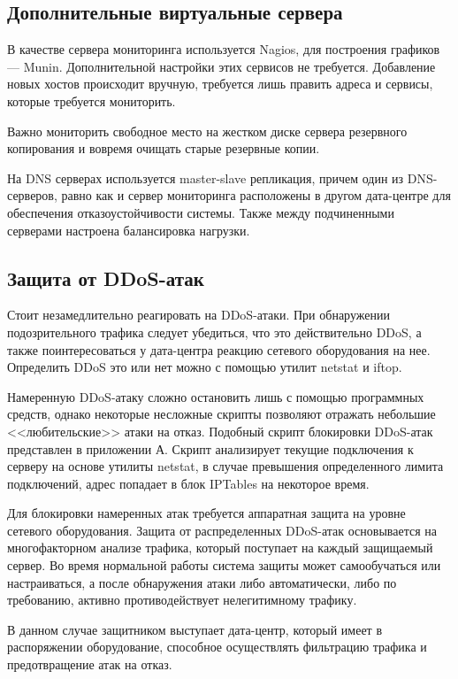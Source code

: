 \subsection{Дополнительные виртуальные сервера}

В качестве сервера мониторинга используется Nagios, для построения графиков --- Munin.
Дополнительной настройки этих сервисов не требуется.
Добавление новых хостов происходит вручную, требуется лишь править адреса и сервисы, которые требуется мониторить.

Важно мониторить свободное место на жестком диске сервера резервного копирования и вовремя очищать старые резервные копии.

На DNS серверах используется master-slave репликация, причем один из DNS-серверов, равно как и сервер мониторинга расположены в другом дата-центре для обеспечения отказоустойчивости системы.
Также между подчиненными серверами настроена балансировка нагрузки.

\subsection{Защита от DDoS-атак}

Стоит незамедлительно реагировать на DDoS-атаки.
При обнаружении подозрительного трафика следует убедиться, что это действительно DDoS, а также поинтересоваться у дата-центра реакцию сетевого оборудования на нее.
Определить DDoS это или нет можно с помощью утилит netstat и iftop.

Намеренную DDoS-атаку сложно остановить лишь с помощью программных средств, однако некоторые несложные скрипты позволяют отражать небольшие <<любительские>> атаки на отказ.
Подобный скрипт блокировки DDoS-атак представлен в приложении А.
Скрипт анализирует текущие подключения к серверу на основе утилиты netstat, в случае превышения определенного лимита подключений, адрес попадает в блок IPTables на некоторое время.

Для блокировки намеренных атак требуется аппаратная защита на уровне сетевого оборудования.
Защита от распределенных DDoS-атак основывается на мно­го­фак­тор­ном анализе трафика, который поступает на каждый защищаемый сервер.
Во время нормальной работы система защиты может самообучаться или настраиваться, а после обнаружения атаки либо автоматически, либо по требованию, активно про­тиво­дей­ству­ет нелегитимному трафику.

В данном случае защитником выступает дата-центр, который имеет в распоряжении оборудование, способное осуществлять фильтрацию трафика и предотвращение атак на отказ.

